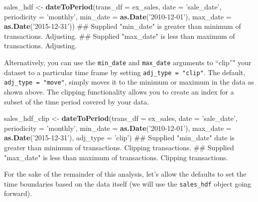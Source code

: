 \documentclass[]{article}
\newenvironment{Shaded}{\begin{snugshade}}{\end{snugshade}}
\newcommand{\DataTypeTok}[1]{\textcolor[rgb]{0.13,0.29,0.53}{#1}}
\newcommand{\KeywordTok}[1]{\textcolor[rgb]{0.13,0.29,0.53}{\textbf{#1}}}
\newcommand{\NormalTok}[1]{#1}
\newcommand{\StringTok}[1]{\textcolor[rgb]{0.31,0.60,0.02}{#1}}
\begin{document}
\begin{Shaded}
\begin{Highlighting}[]
\NormalTok{  sales_hdf <-}\StringTok{ }\KeywordTok{dateToPeriod}\NormalTok{(}\DataTypeTok{trans_df =}\NormalTok{ ex_sales,}
                            \DataTypeTok{date =} \StringTok{'sale_date'}\NormalTok{,}
                            \DataTypeTok{periodicity =} \StringTok{'monthly'}\NormalTok{,}
                            \DataTypeTok{min_date =} \KeywordTok{as.Date}\NormalTok{(}\StringTok{'2010-12-01'}\NormalTok{),}
                            \DataTypeTok{max_date =} \KeywordTok{as.Date}\NormalTok{(}\StringTok{'2015-12-31'}\NormalTok{))}
\NormalTok{## Supplied "min_date" is greater than minimum of transactions. Adjusting.}
\NormalTok{## Supplied "max_date" is less than maximum of transactions. Adjusting.}
\end{Highlighting}
\end{Shaded}

Alternatively, you can use the \texttt{min\_date} and \texttt{max\_date}
arguments to ``clip''" your dataset to a particular time frame by
setting \texttt{adj\_type\ =\ "clip"}. The default,
\texttt{adj\_type\ =\ "move"}, simply moves it to the minimum or maximum
in the data as shown above. The clipping functionality allows you to
create an index for a subset of the time period covered by your data.

\begin{Shaded}
\begin{Highlighting}[]
\NormalTok{  sales_hdf_clip <-}\StringTok{ }\KeywordTok{dateToPeriod}\NormalTok{(}\DataTypeTok{trans_df =}\NormalTok{ ex_sales,}
                                 \DataTypeTok{date =} \StringTok{'sale_date'}\NormalTok{,}
                                 \DataTypeTok{periodicity =} \StringTok{'monthly'}\NormalTok{,}
                                 \DataTypeTok{min_date =} \KeywordTok{as.Date}\NormalTok{(}\StringTok{'2010-12-01'}\NormalTok{),}
                                 \DataTypeTok{max_date =} \KeywordTok{as.Date}\NormalTok{(}\StringTok{'2015-12-31'}\NormalTok{),}
                                 \DataTypeTok{adj_type =} \StringTok{'clip'}\NormalTok{)}
\NormalTok{## Supplied "min_date" date is greater than minimum of transactions. Clipping transactions.}
\NormalTok{## Supplied "max_date" is less than maximum of transactions. Clipping transactions.}
\end{Highlighting}
\end{Shaded}

For the sake of the remainder of this analysis, let's allow the defaults
to set the time boundaries based on the data itself (we will use the
\texttt{sales\_hdf} object going forward).
\end{document}
